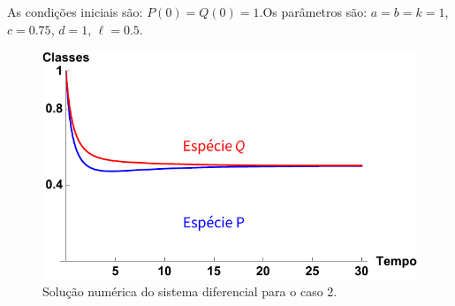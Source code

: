 As condições iniciais são: $P(0)=Q(0)=1$.\newline Os parâmetros são:  $a=b=k=1$, $c=0.75$, $d=1$, $\ell=0.5$.
\begin{figure}[htbp]
\centering
\includegraphics[keepaspectratio=true,scale=0.75]{caso2_a.pdf}
\caption{Solução numérica do sistema diferencial para o caso 2.}
\label{figy}
\end{figure}
\bigskip

